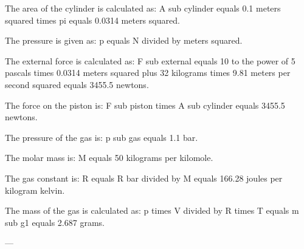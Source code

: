 The area of the cylinder is calculated as:  
A sub cylinder equals 0.1 meters squared times pi equals 0.0314 meters squared.  

The pressure is given as:  
p equals N divided by meters squared.  

The external force is calculated as:  
F sub external equals 10 to the power of 5 pascals times 0.0314 meters squared plus 32 kilograms times 9.81 meters per second squared equals 3455.5 newtons.  

The force on the piston is:  
F sub piston times A sub cylinder equals 3455.5 newtons.  

The pressure of the gas is:  
p sub gas equals 1.1 bar.  

The molar mass is:  
M equals 50 kilograms per kilomole.  

The gas constant is:  
R equals R bar divided by M equals 166.28 joules per kilogram kelvin.  

The mass of the gas is calculated as:  
p times V divided by R times T equals m sub g1 equals 2.687 grams.  

---
